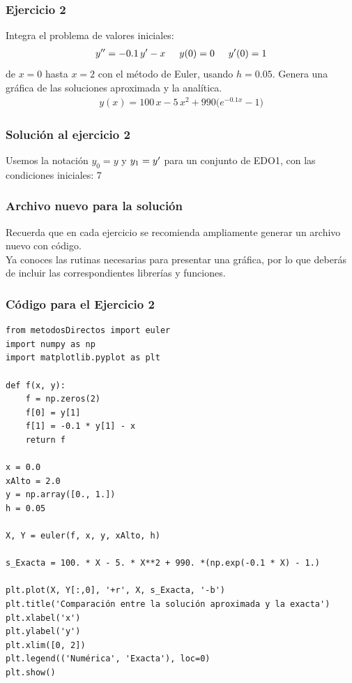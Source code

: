 \documentclass[12pt]{beamer}
\begin{document}
\begin{frame}
\frametitle{Ejercicio 2}
Integra el problema de valores iniciales:
\begin{align*}
{y}^{\prime \prime} = -0.1 \, {y}^{\prime} - x \hspace{0.5cm} y (0) = 0 \hspace{0.5cm} {y}^{\prime} (0) = 1
\end{align*}
de $x = 0$ hasta $x = 2$ con el método de Euler, usando $h = 0.05$. Genera una gráfica de las soluciones aproximada y la analítica.
\pause
\begin{align*}
y (x) = 100 \, x - 5 \, x^{2} + 990 \big( e^{-0.1 x} - 1 \big)
\end{align*}
\end{frame}
\begin{frame}
\frametitle{Solución al ejercicio 2}
Usemos la notación $y_{0} = y$ y $y_{1} = {y}^{\prime}$ para un conjunto de EDO1, con las condiciones iniciales:
7
\end{frame}
\begin{frame}
\frametitle{Archivo nuevo para la solución}
Recuerda que en cada ejercicio se recomienda ampliamente generar un archivo nuevo con código.
\\
\bigskip
\pause
Ya conoces las rutinas necesarias para presentar una gráfica, por lo que deberás de incluir las correspondientes librerías y funciones.
\end{frame}
\begin{frame}
\frametitle{Código para el Ejercicio 2}
\begin{lstlisting}[caption=Código para resolver el ejercicio con el método de Euler]
from metodosDirectos import euler
import numpy as np
import matplotlib.pyplot as plt

def f(x, y):
	f = np.zeros(2)
	f[0] = y[1]
	f[1] = -0.1 * y[1] - x
	return f

x = 0.0
xAlto = 2.0
y = np.array([0., 1.])
h = 0.05

X, Y = euler(f, x, y, xAlto, h)

s_Exacta = 100. * X - 5. * X**2 + 990. *(np.exp(-0.1 * X) - 1.)

plt.plot(X, Y[:,0], '+r', X, s_Exacta, '-b')
plt.title('Comparación entre la solución aproximada y la exacta')
plt.xlabel('x')
plt.ylabel('y')
plt.xlim([0, 2])
plt.legend(('Numérica', 'Exacta'), loc=0)
plt.show()
\end{lstlisting}
\end{frame}
\end{document}
